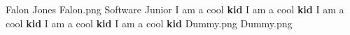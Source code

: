 \insertbio
{Falon Jones}
{Falon.png}
{}
{Software}
{Junior}
{
I am a cool \textbf{kid}
I am a cool \textbf{kid}
I am a cool \textbf{kid}
I am a cool \textbf{kid}
I am a cool \textbf{kid}
}
{Dummy.png}
{Dummy.png}
